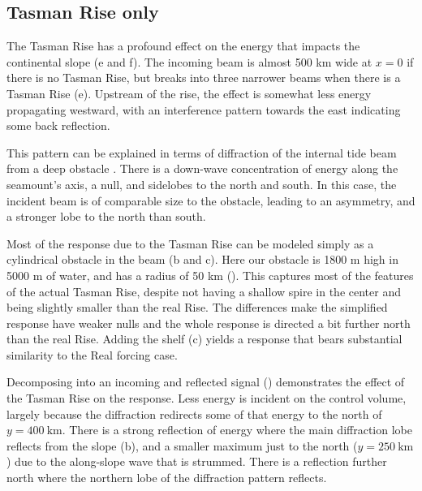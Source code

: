 \documentclass[12pt]{article}
\newcommand{\tempS}[1]{}
\newcommand{\mn}[1]{{\sc #1}}
\begin{document}
\subsection{Tasman Rise only}

The Tasman Rise has a profound effect on the energy that impacts the continental slope (e and f).  The incoming beam is almost 500 km wide at $x=0$ if there is no Tasman Rise, but breaks into three narrower beams when there is a Tasman Rise (e).  Upstream of the rise, the effect is somewhat less energy propagating westward, with an  interference pattern towards the east indicating some back reflection.  



This pattern can be explained in terms of diffraction of the internal tide beam from a deep obstacle \citep[i.e.][]{johnstonetal03}.  There is a down-wave concentration of energy along the seamount's axis, a null, and sidelobes to the north and south.  In this case, the incident beam is of comparable size to the obstacle, leading to an asymmetry, and a stronger lobe to the north than south.  

Most of the response due to the Tasman Rise can be modeled simply as a cylindrical obstacle in the beam (b and c).  Here our obstacle is 1800 m high in 5000 m of water, and has a radius of 50 km ().  This captures most of the features of the actual Tasman Rise, despite not having a shallow spire in the center and being slightly smaller than the real Rise.  The differences make the simplified response have weaker nulls and the whole response is directed a bit further north than the real Rise.  Adding the shelf (c) yields a response that bears substantial similarity to the \mn{Real} forcing case.  

Decomposing into an incoming and reflected signal () demonstrates the effect of the Tasman Rise on the response.  Less energy is incident on the control volume, largely because the diffraction redirects some of that energy to the north of $y=400\ \mathrm{km}$.  There is a strong reflection of energy where the main diffraction lobe reflects from the slope (b), and a smaller maximum just to the north ($y=250\ \mathrm{km}$) due to the along-slope wave that is strummed.  There is a reflection further north where the northern lobe of the diffraction pattern reflects.  
\end{document}
